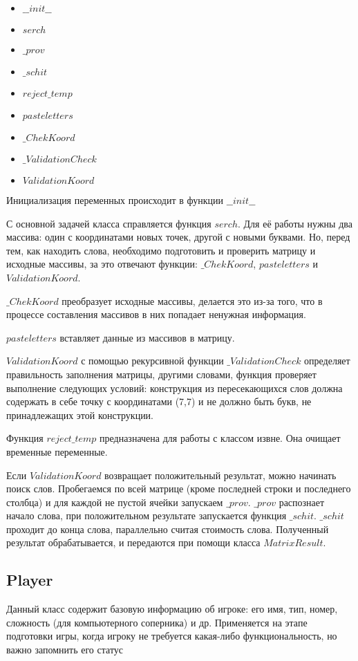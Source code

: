 \documentclass[a4paper,14pt]{article}
\begin{document}
	\begin {itemize}
		\item$\_\_init\_\_$
		\item $serch$	
		\item $\_prov$
		\item $\_schit$
		\item $reject\_temp$		
		\item $pasteletters$
		\item $\_ChekKoord$
		\item $\_ValidationCheck$	
		\item $ValidationKoord$
	\end {itemize}
	
	Инициализация переменных происходит в функции $\_\_init\_\_$
	
	С основной задачей класса справляется функция $serch$. Для её работы нужны два массива: один с координатами новых точек, другой с новыми буквами. Но, перед тем, как находить слова, необходимо подготовить и проверить матрицу и исходные массивы, за это отвечают функции: $\_ChekKoord$, $pasteletters$ и $ValidationKoord$.
	
	$\_ChekKoord$ преобразует исходные массивы, делается это из-за того, что в процессе составления массивов в них попадает ненужная информация.
	
	$pasteletters$ вставляет данные из массивов в матрицу.
	
	$ValidationKoord$ с помощью рекурсивной функции $\_ValidationCheck$ определяет правильность заполнения матрицы, другими словами, функция проверяет выполнение следующих условий: конструкция из пересекающихся слов должна содержать в себе точку с координатами (7,7) и не должно быть букв, не принадлежащих этой конструкции.
	
	Функция $reject\_temp$ предназначена для работы с классом извне. Она очищает временные переменные.  
	
	Если $ValidationKoord$ возвращает положительный результат, можно начинать поиск слов. Пробегаемся по всей матрице (кроме последней строки и последнего столбца) и для каждой не пустой ячейки запускаем $\_prov$. $\_prov$ распознает начало слова, при положительном результате запускается функция $\_schit$. $\_schit$ проходит до конца слова, параллельно считая стоимость слова.	Полученный результат обрабатывается, и передаются при помощи класса $MatrixResult$.
	
	\subsection{Player}
	Данный класс содержит базовую информацию об игроке: его имя, тип, номер, сложность (для компьютерного соперника) и др. Применяется на этапе подготовки игры, когда игроку не требуется какая-либо функциональность, но важно запомнить его статус
	
\end{document}
